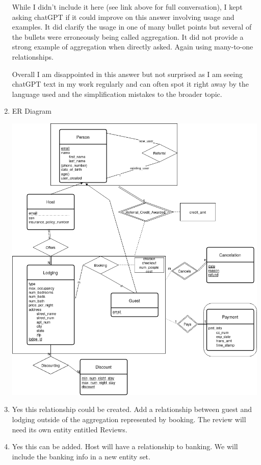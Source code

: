 \documentclass[11pt]{article}
\begin{document}
\begin{enumerate}
While I didn't include it here (see link above for full conversation), I kept asking chatGPT if it could improve on this answer involving usage and examples.  It did clarify the usage in one of many bullet points but several of the bullets were erroneously being called aggregation.  It did not provide a strong example of aggregation when directly asked.  Again using many-to-one relationships.

Overall I am disappointed in this answer but not surprised as I am seeing chatGPT text in my work regularly and can often spot it right away by the language used and the simplification mistakes to the broader topic.

\item ER Diagram

\includegraphics[width = \textwidth]{question1.png}

\item Yes this relationship could be created.  Add a relationship between guest and lodging outside of the aggregation represented by booking.  The review will need its own entity entitled Reviews. 

\item Yes this can be added.  Host will have a relationship to banking.  We will include the banking info in a new entity set.



\end{enumerate}
\end{document}
